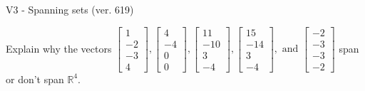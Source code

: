 \begin{exercise}
  \begin{exerciseTitle}V3 - Spanning sets (ver. 619)\end{exerciseTitle}
  \begin{exerciseStatement}
    Explain why the vectors \(\left[\begin{array}{r}
1 \\
-2 \\
-3 \\
4
\end{array}\right] , \left[\begin{array}{r}
4 \\
-4 \\
0 \\
0
\end{array}\right] , \left[\begin{array}{r}
11 \\
-10 \\
3 \\
-4
\end{array}\right] , \left[\begin{array}{r}
15 \\
-14 \\
3 \\
-4
\end{array}\right] , \text{ and } \left[\begin{array}{r}
-2 \\
-3 \\
-3 \\
-2
\end{array}\right]\) span or don't span \(\mathbb{R}^4\). 
	



\end{exerciseStatement}
\end{exercise}
